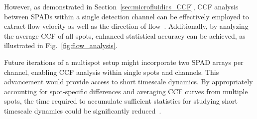 However, as demonstrated in Section~\ref{sec:microfluidics_CCF}, \ac{CCF} analysis between \ac{SPAD}s within a single detection channel can be effectively employed to extract flow velocity as well as the direction of flow~\cite{brinkmeier_AC_1999}. 
Additionally, by analyzing the average \ac{CCF} of all spots, enhanced statistical accuracy can be achieved, as illustrated in Fig.~\ref{fig:flow_analysis}. 

Future iterations of a multispot setup might incorporate two \ac{SPAD} arrays per channel, enabling \ac{CCF} analysis within single spots and channels. 
This advancement would provide access to short timescale dynamics. By appropriately accounting for spot-specific differences and averaging \ac{CCF} curves from multiple spots, the time required to accumulate sufficient statistics for studying short timescale dynamics could be significantly reduced~\cite{felekyan_RSI_2005}.

